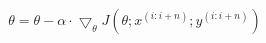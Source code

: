 \documentclass[11pt]{article}
\begin{document}
\begin{itemize}
        \begin{equation}
            \theta = \theta - \alpha \cdot \bigtriangledown_\theta J(\theta;{x^{(i:i+n)}};{y^{(i:i+n)}})
        \end{equation}
\end{itemize}

\end{document}
